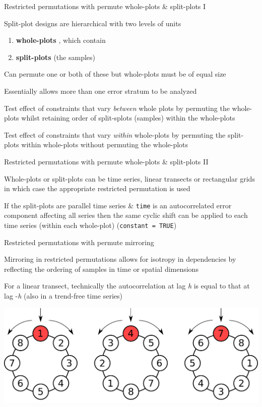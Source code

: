 \documentclass[10pt,ignorenonframetext,compress, aspectratio=169]{beamer}
\providecommand{\tightlist}{%
  \setlength{\itemsep}{0pt}\setlength{\parskip}{0pt}}
\begin{document}
\begin{frame}{Restricted permutations with permute \textbar{}
whole-plots \& split-plots I}

Split-plot designs are hierarchical with two levels of units

\begin{enumerate}
\def\labelenumi{\arabic{enumi}.}
\tightlist
\item
  \textbf{whole-plots} , which contain
\item
  \textbf{split-plots} (the samples)
\end{enumerate}

Can permute one or both of these but whole-plots must be of equal size

Essentially allows more than one error stratum to be analyzed

Test effect of constraints that vary \emph{between} whole plots by
permuting the whole-plots whilst retaining order of split-splots
(samples) within the whole-plots

Test effect of constraints that vary \emph{within} whole-plots by
permuting the split-plots within whole-plots without permuting the
whole-plots

\end{frame}

\begin{frame}[fragile]{Restricted permutations with permute \textbar{}
whole-plots \& split-plots II}

Whole-plots or split-plots can be time series, linear transects or
rectangular grids in which case the appropriate restricted permutation
is used

If the split-plots are parallel time series \& \texttt{time} is an
autocorrelated error component affecting all series then the same cyclic
shift can be applied to each time series (within each whole-plot)
(\texttt{constant\ =\ TRUE})

\end{frame}

\begin{frame}{Restricted permutations with permute \textbar{} mirroring}

Mirroring in restricted permutations allows for isotropy in dependencies
by reflecting the ordering of samples in time or spatial dimensions

For a linear transect, technically the autocorrelation at lag \emph{h}
is equal to that at lag -\emph{h} (also in a trend-free time series)

\includegraphics[width=\linewidth]{cyclic-shifts-with-mirror-figure}

\end{frame}
\end{document}
